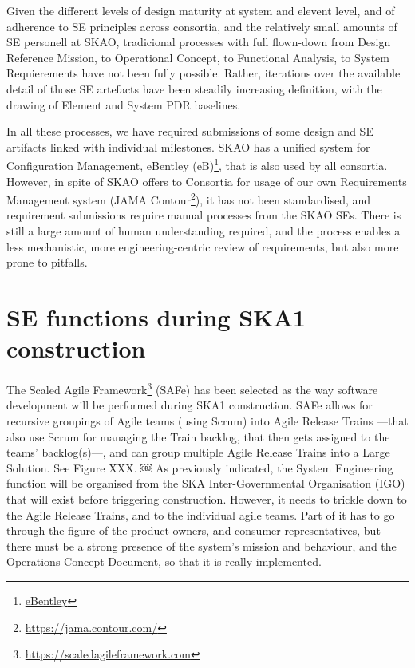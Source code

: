 \documentclass[11pt,twoside]{article}
\begin{document}
Given the different levels of design maturity at system and elevent level, and of adherence to SE principles across consortia, and the relatively small amounts of SE personell at SKAO, tradicional processes with full flown-down from Design Reference Mission, to Operational Concept, to Functional Analysis, to System Requierements have not been fully possible. Rather, iterations over the available detail of those SE artefacts have been steadily increasing definition, with the drawing of Element and System PDR baselines.

In all these processes, we have required submissions of some design and SE artifacts linked with individual milestones. SKAO has a unified system for Configuration Management, eBentley (eB)\footnote{\url{eBentley}}, that is also used by all consortia. However, in spite of SKAO offers to Consortia for usage of our own Requirements Management system (JAMA Contour\footnote{\url{https://jama.contour.com/}}), it has not been standardised, and requirement submissions require manual processes from the SKAO SEs. There is still a large amount of human understanding required, and the process enables a less mechanistic, more engineering-centric review of requirements, but also more prone to pitfalls.


\section{SE functions during SKA1 construction} %
\label{sec:se_functions_during_ska1_construction}
The Scaled Agile Framework\footnote{\url{https://scaledagileframework.com}} (SAFe) has been selected as the way software development will be performed during SKA1 construction. SAFe allows for recursive groupings of Agile teams (using Scrum) into Agile Release Trains —that also use Scrum for managing the Train backlog, that then gets assigned to the teams’ backlog(s)—, and can group multiple Agile Release Trains into a Large Solution. See Figure XXX.	
￼	
As previously indicated, the System Engineering function will be organised from the SKA Inter-Governmental Organisation (IGO) that will exist before triggering construction. However, it needs to trickle down to the Agile Release Trains, and to the individual agile teams.	
Part of it has to go through the figure of the product owners, and consumer representatives, but there must be a strong presence of the system’s mission and behaviour, and the Operations Concept Document, so that it is really implemented.	
	
\end{document}
